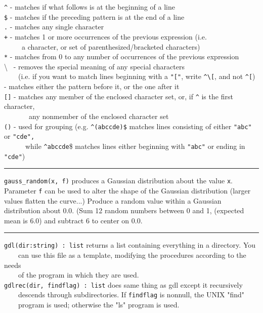 \texttt{\^{}} - matches if what follows is at the beginning of a line\\
\texttt{\$} - matches if the preceding pattern is at the end of a line\\
\texttt{.} - matches any single character\\
\texttt{+} - matches 1 or more occurrences of the previous
expression (i.e. \\
 \ \ \ \ \ a character, or set of parenthesized/bracketed
characters)\\
\texttt{*} - matches from 0 to any number of occurrences of the previous
expression\\
{\textbackslash} \ {}- removes the special meaning of any special
characters\\
 \ \ \ \ (i.e. if you want to match lines beginning with a
\texttt{"["}, write
\texttt{\^{}{\textbackslash}[}, and not \texttt{\^{}[})\\
\texttt{{\textbar}} - matches either the pattern before it, or the one
after it\\
\texttt{[]} - matches any member of the enclosed character set, or, if
\texttt{\^{}} is the first character,\\
 \ \ \ \ \ \ \ any nonmember of the enclosed character set \\
\texttt{()} - used for grouping (e.g. \texttt{\^{}(abc{\textbar}cde)\$} matches
lines consisting of either \texttt{"abc"}
or \texttt{"cde",}\\
 \ \ \ \ \ \ while \texttt{\^{}abc{\textbar}cde}\$ matches lines either
beginning with \texttt{"abc"} or ending in
\texttt{"cde"})

\vspace{0.25cm}\hrule{}

\texttt{gauss\_random(x, f)} produces a Gaussian distribution about the value \texttt{x}.
Parameter \texttt{f} can be used to alter the shape of the Gaussian
distribution (larger values flatten the curve...) Produce a random
value within a Gaussian distribution about 0.0. (Sum 12 random numbers
between 0 and 1, (expected mean is 6.0) and subtract 6 to center on 0.0.

\vspace{0.25cm}\hrule{}

\texttt{gdl(dir:string) : list} returns a list containing everything in
a directory. You\\
 \ \ \ \ can use this file as a template, modifying the procedures
according to the needs\\
 \ \ \ \ of the program in which they are used.\\
\texttt{gdlrec(dir, findflag) : list} does same thing as gdl except it
recursively\\
 \ \ \ \ descends through subdirectories. If \texttt{findflag} is
nonnull, the UNIX "find"\\
 \ \ \ \ program is used; otherwise the "ls" program
is used.

